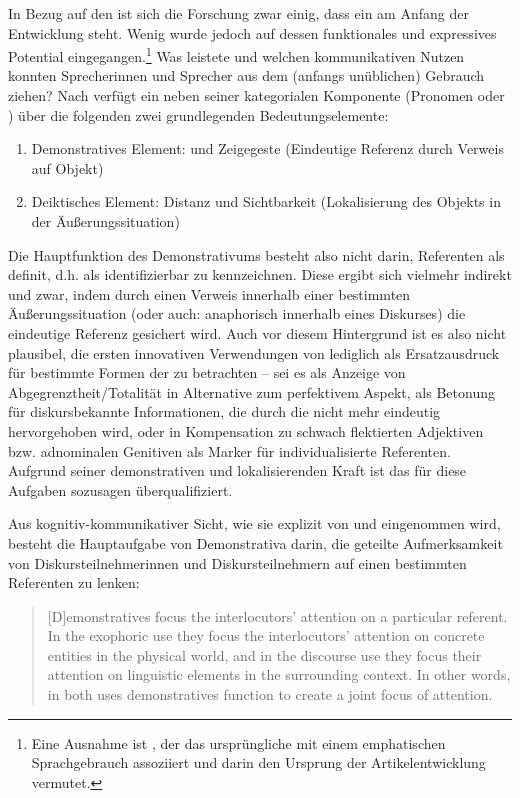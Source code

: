 In Bezug auf den  ist sich die Forschung zwar einig, dass ein  am Anfang der Entwicklung steht. Wenig wurde jedoch auf dessen funktionales und expressives Potential eingegangen.\footnote{Eine Ausnahme ist \textcite[16--17]{Hodler1954}, der das ursprüngliche  mit einem emphatischen Sprachgebrauch assoziiert und darin den Ursprung der Artikelentwicklung vermutet.} Was leistete  und welchen kommunikativen Nutzen konnten Sprecherinnen und Sprecher aus dem (anfangs unüblichen) Gebrauch ziehen? Nach \textcite[40]{Lehmann2015} verfügt ein  neben seiner kategorialen Komponente (Pronomen oder ) über die folgenden zwei grundlegenden Bedeutungselemente:

\begin{enumerate}
\item Demonstratives Element:  und Zeigegeste (Eindeutige Referenz durch  Verweis auf Objekt)  
\item Deiktisches Element:  Distanz und Sichtbarkeit (Lokalisierung des Objekts in der Äußerungssituation)
\end{enumerate}
\noindent
Die Hauptfunktion des Demonstrativums  besteht also  nicht darin, Referenten als definit, d.h. als identifizierbar zu kennzeichnen. Diese ergibt sich vielmehr indirekt und zwar, indem durch einen Verweis innerhalb einer bestimmten Äußerungssituation (oder auch: anaphorisch  innerhalb eines Diskurses) die eindeutige Referenz  gesichert wird. Auch vor diesem Hintergrund ist es also nicht plausibel, die ersten innovativen Verwendungen von  lediglich als Ersatzausdruck für bestimmte Formen der  zu betrachten -- sei es als Anzeige von Abgegrenztheit/Totalität in Alternative zum perfektivem  Aspekt, als Betonung für diskursbekannte Informationen, die durch die  nicht mehr eindeutig hervorgehoben wird, oder in Kompensation zu schwach flektierten Adjektiven bzw. adnominalen Genitiven  als Marker für individualisierte  Referenten. Aufgrund seiner demonstrativen und lokalisierenden Kraft ist das  für diese Aufgaben sozusagen überqualifiziert. 

Aus kognitiv-kommunikativer Sicht, wie sie explizit von \textcite{Epstein1993,Epstein1994} und \textcite{Diessel2006} eingenommen wird, besteht die Hauptaufgabe von Demonstrativa  darin, die geteilte Aufmerksamkeit von Diskursteilnehmerinnen und Diskursteilnehmern auf einen bestimmten Referenten zu lenken: \blockcquote[476]{Diessel2006}{[D]emonstratives
focus the interlocutors’ attention on a particular referent. In the
exophoric use they focus the interlocutors’ attention on concrete entities
in the physical world, and in the discourse use they focus their attention
on linguistic elements in the surrounding context. In other words, in both
uses demonstratives function to create a joint focus of attention.}

